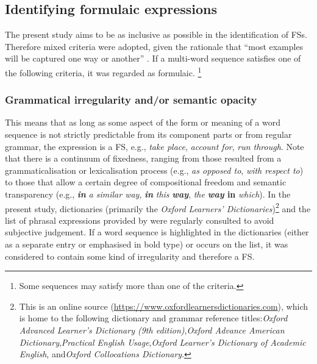 \documentclass[output=paper]{langscibook}
\begin{document}
\subsection{Identifying formulaic expressions}\label{sec:wang:2.2}

The present study aims to be as inclusive as possible in the identification of FSs. Therefore mixed criteria were adopted, given the rationale that “most examples will be captured one way or another” \citep[110]{Wray2008}. If a multi-word sequence satisfies one of the following criteria, it was regarded as formulaic. \footnote{{Some sequences may satisfy more than one of the criteria.}}

\subsubsection{Grammatical irregularity and/or semantic opacity \citep{Wray2008,SchneiderEtAl2014,Herbst2015}}

This means that as long as some aspect of the form or meaning of a word sequence is not strictly predictable from its component parts or from regular grammar, the expression is a FS, e.g., \textit{take place}, \textit{account for}, \textit{run through}. Note that there is a continuum of fixedness, ranging from those resulted from a grammaticalisation or lexicalisation process (e.g., \textit{as opposed to}, \textit{with respect to}) to those that allow a certain degree of compositional freedom and semantic transparency (e.g., \textbf{\textit{in}} \textit{a similar way}, \textbf{\textit{in}} \textit{this} \textbf{\textit{way}}, \textit{the} \textbf{\textit{way} \textbf{in}} \textit{which}). In the present study, dictionaries (primarily the \textit{Oxford Learners’ Dictionaries})\footnote{{This is an online source (}\url{https://www.oxfordlearnersdictionaries.com}\textrm{), which is home to the following dictionary and grammar reference titles:}{\textit{Oxford Advanced Learner’s Dictionary (9th edition)}},{\textit{Oxford Advance American Dictionary}},{\textit{Practical English Usage}},{\textit{Oxford Learner’s Dictionary of Academic English}}\textrm{, and}{\textit{Oxford Collocations Dictionary}}.} and the list of phrasal expressions provided by \citet{MartinezSchmitt2012} were regularly consulted to avoid subjective judgement. If a word sequence is highlighted in the dictionaries (either as a separate entry or emphasised in bold type) or occurs on the list, it was considered to contain some kind of irregularity and therefore a FS.
\end{document}
